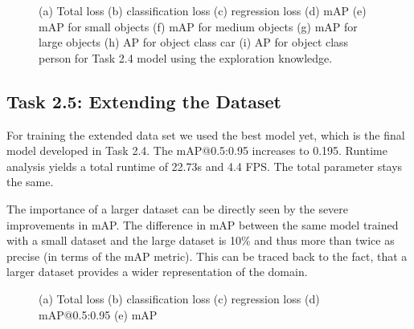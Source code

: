 \documentclass{article}
\begin{document}
\newpage
\begin{figure}[t!]
    \centering
    \subfigure[]{}
    \subfigure[]{}
    \subfigure[]{}
    \subfigure[]{}
    \subfigure[]{}
    \subfigure[]{}
    \subfigure[]{}
    \subfigure[]{}
    \subfigure[]{}
    \caption{(a) Total loss (b) classification loss (c) regression loss (d) mAP (e) mAP for small objects (f) mAP for medium objects (g) mAP for large objects (h) AP for object class car (i) AP for object class person for Task 2.4 model using the exploration knowledge.}
    \label{fig:loss-2-4}
\end{figure}
\newpage

\subsection*{Task 2.5: Extending the Dataset}

For training the extended data set we used the best model yet, which is the final model developed in Task 2.4. The mAP@0.5:0.95 increases to 0.195. Runtime analysis yields a total runtime of 22.73s and 4.4 FPS. The total parameter stays the same.

The importance of a larger dataset can be directly seen by the severe improvements in mAP. The difference in mAP between the same model trained with a small dataset and the large dataset is 10\% and thus more than twice as precise (in terms of the mAP metric). This can be traced back to the fact, that a larger dataset provides a wider representation of the domain.

\begin{figure}[t!]
    \centering
    \subfigure[]{}
    \vspace{-0.15cm}
    \subfigure[]{}
    \subfigure[]{}
    \subfigure[]{}
    \caption{(a) Total loss (b) classification loss (c) regression loss (d) mAP@0.5:0.95 (e) mAP}
    \label{fig:loss-2-5}
\end{figure}
\end{document}
